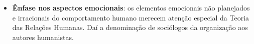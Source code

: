 \begin{itemize}
	\item \textbf{Ênfase nos aspectos emocionais}: os elementos emocionais não planejados e irracionais do comportamento humano merecem atenção
	especial da Teoria das Relações Humanas. Daí a denominação de sociólogos da organização aos autores humanistas.
\end{itemize}